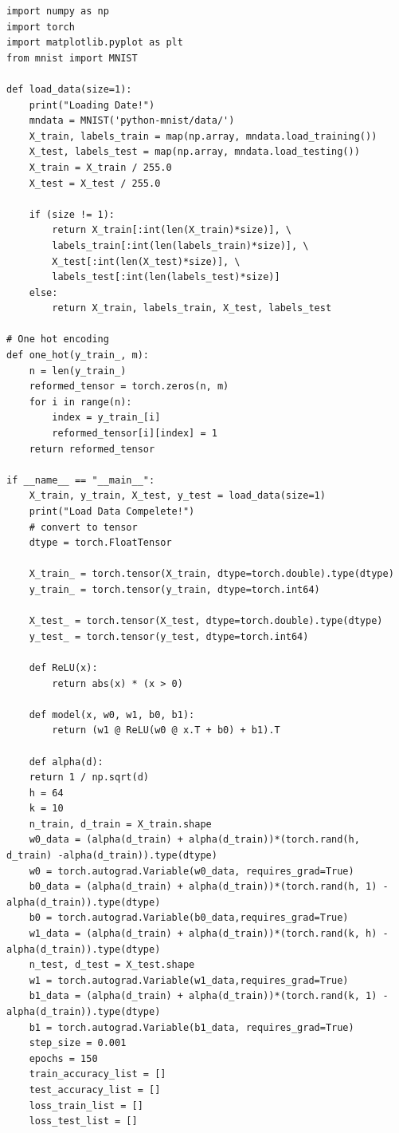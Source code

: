 \documentclass{article}
\begin{document}
\begin{verbatim}
import numpy as np
import torch
import matplotlib.pyplot as plt
from mnist import MNIST

def load_data(size=1):
	print("Loading Date!")
	mndata = MNIST('python-mnist/data/')
	X_train, labels_train = map(np.array, mndata.load_training())
	X_test, labels_test = map(np.array, mndata.load_testing())
	X_train = X_train / 255.0
	X_test = X_test / 255.0
	
	if (size != 1):
		return X_train[:int(len(X_train)*size)], \
		labels_train[:int(len(labels_train)*size)], \
		X_test[:int(len(X_test)*size)], \
		labels_test[:int(len(labels_test)*size)]
	else:
		return X_train, labels_train, X_test, labels_test

# One hot encoding
def one_hot(y_train_, m):
	n = len(y_train_)
	reformed_tensor = torch.zeros(n, m)
	for i in range(n):
		index = y_train_[i]
		reformed_tensor[i][index] = 1
	return reformed_tensor

if __name__ == "__main__":
	X_train, y_train, X_test, y_test = load_data(size=1)
	print("Load Data Compelete!")
	# convert to tensor
	dtype = torch.FloatTensor
	
	X_train_ = torch.tensor(X_train, dtype=torch.double).type(dtype)
	y_train_ = torch.tensor(y_train, dtype=torch.int64)
	
	X_test_ = torch.tensor(X_test, dtype=torch.double).type(dtype)
	y_test_ = torch.tensor(y_test, dtype=torch.int64)
	
	def ReLU(x):
		return abs(x) * (x > 0)
	
	def model(x, w0, w1, b0, b1):
		return (w1 @ ReLU(w0 @ x.T + b0) + b1).T
	
	def alpha(d):
	return 1 / np.sqrt(d)
	h = 64
	k = 10
	n_train, d_train = X_train.shape
	w0_data = (alpha(d_train) + alpha(d_train))*(torch.rand(h, d_train) -alpha(d_train)).type(dtype)
	w0 = torch.autograd.Variable(w0_data, requires_grad=True)
	b0_data = (alpha(d_train) + alpha(d_train))*(torch.rand(h, 1) -alpha(d_train)).type(dtype)
	b0 = torch.autograd.Variable(b0_data,requires_grad=True)
	w1_data = (alpha(d_train) + alpha(d_train))*(torch.rand(k, h) -alpha(d_train)).type(dtype)
	n_test, d_test = X_test.shape
	w1 = torch.autograd.Variable(w1_data,requires_grad=True)
	b1_data = (alpha(d_train) + alpha(d_train))*(torch.rand(k, 1) -alpha(d_train)).type(dtype)
	b1 = torch.autograd.Variable(b1_data, requires_grad=True)
	step_size = 0.001
	epochs = 150
	train_accuracy_list = []
	test_accuracy_list = []
	loss_train_list = []
	loss_test_list = []
	

\end{verbatim}
\end{document}
